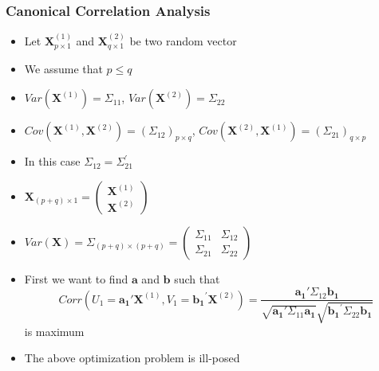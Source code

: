\documentclass[10pt]{beamer} %
\begin{document}
\begin{frame}
	\frametitle{Canonical Correlation Analysis}
	\begin{itemize}
      \item Let $\boldsymbol{X}^{(1)}_{p \times 1}$ and $\boldsymbol{X}^{(2)}_{q
         \times 1}$ be two random vector
         \vspace{0.25cm}
		\item We assume that $p \leq q$
         \vspace{0.25cm}
		\item $Var(\boldsymbol{X}^{(1)})=\Sigma_{11}$, $Var(\boldsymbol{X}^{(2)})=\Sigma_{22}$
         \vspace{0.25cm}
      \item $Cov(\boldsymbol{X}^{(1)},\boldsymbol{X}^{(2)}) = (\Sigma_{12})_{p
         \times q}$, $Cov(\boldsymbol{X}^{(2)},\boldsymbol{X}^{(1)}) =
         (\Sigma_{21})_{q \times p}$
         \vspace{0.25cm}
      \item In this case $\Sigma_{12}=\Sigma_{21}^{'}$
	\end{itemize}
\end{frame}

\begin{frame}
   \begin{itemize}
      \item $\boldsymbol{X}_{(p+q) \times 1} = \begin{pmatrix}
            \boldsymbol{X}^{(1)} \\ \boldsymbol{X}^{(2)}
            \end{pmatrix}$
      \item $Var(\boldsymbol{X}) = \Sigma_{(p+q) \times (p+q)} = \begin{pmatrix}
            \Sigma_{11} & \Sigma_{12} \\
            \Sigma_{21} & \Sigma_{22}
            \end{pmatrix}$
            \vspace{0.25cm}
      \item First we want to find $\boldsymbol{a}$ and $\boldsymbol{b}$ such
         that
         $$Corr(U_1=\boldsymbol{a_{1}'}\boldsymbol{X}^{(1)},V_1=\boldsymbol{b_1}^{'}\boldsymbol{X}^{(2)})
            =\frac{\boldsymbol{a_{1}'}\Sigma_{12}\boldsymbol{b_1}}{\sqrt{\boldsymbol{a_{1}'}\Sigma_{11}\boldsymbol{a_1}}\sqrt{\boldsymbol{b_1}^{'}\Sigma_{22}\boldsymbol{b_1}}}
            $$
         is maximum
      \item The above optimization problem is ill-posed
   \end{itemize}   
\end{frame}
\end{document}
